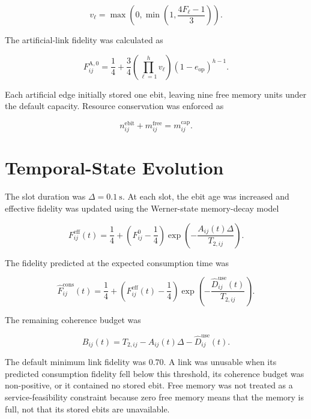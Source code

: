 \begin{equation}
v_\ell
=
\max
\left(
0,
\min
\left(
1,
\frac{4F_\ell-1}{3}
\right)
\right).
\end{equation}

The artificial-link fidelity was calculated as

\begin{equation}
F_{ij}^{\mathrm{A},0}
=
\frac{1}{4}
+
\frac{3}{4}
\left(
\prod_{\ell=1}^{h}v_\ell
\right)
(1-e_{\mathrm{op}})^{h-1}.
\end{equation}

Each artificial edge initially stored one ebit, leaving nine free memory units
under the default capacity. Resource conservation was enforced as

\begin{equation}
n_{ij}^{\mathrm{ebit}}
+
m_{ij}^{\mathrm{free}}
=
m_{ij}^{\mathrm{cap}}.
\end{equation}

\section{Temporal-State Evolution}

The slot duration was \(\Delta=0.1~\mathrm{s}\). At each slot, the ebit age was
increased and effective fidelity was updated using the Werner-state memory-decay
model

\begin{equation}
F_{ij}^{\mathrm{eff}}(t)
=
\frac{1}{4}
+
\left(
F_{ij}^{0}-\frac{1}{4}
\right)
\exp
\left(
-\frac{A_{ij}(t)\Delta}{T_{2,ij}}
\right).
\end{equation}

The fidelity predicted at the expected consumption time was

\begin{equation}
\widehat{F}_{ij}^{\mathrm{cons}}(t)
=
\frac{1}{4}
+
\left(
F_{ij}^{\mathrm{eff}}(t)-\frac{1}{4}
\right)
\exp
\left(
-\frac{\widehat{D}_{ij}^{\mathrm{use}}(t)}
{T_{2,ij}}
\right).
\end{equation}

The remaining coherence budget was

\begin{equation}
B_{ij}(t)
=
T_{2,ij}
-
A_{ij}(t)\Delta
-
\widehat{D}_{ij}^{\mathrm{use}}(t).
\end{equation}

The default minimum link fidelity was \(0.70\). A link was unusable when its
predicted consumption fidelity fell below this threshold, its coherence budget
was non-positive, or it contained no stored ebit. Free memory was not treated as
a service-feasibility constraint because zero free memory means that the memory
is full, not that its stored ebits are unavailable.

